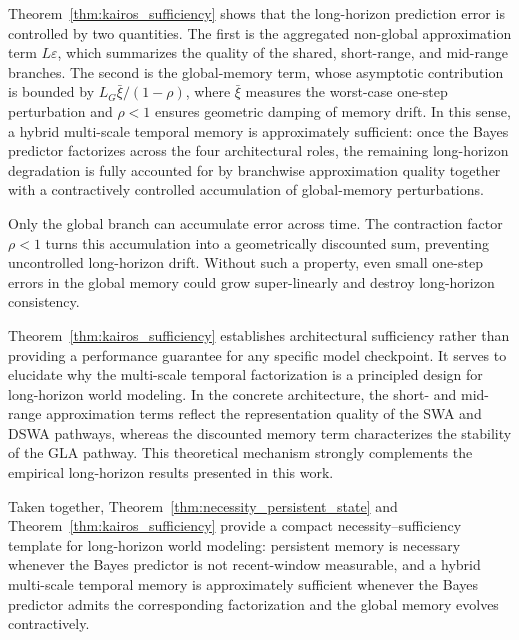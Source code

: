 \documentclass{llmxive}
\begin{document}
\begin{remark}
\label{rem:interpretation}
Theorem~\ref{thm:kairos_sufficiency} shows that the long-horizon prediction error is controlled by two quantities. The first is the aggregated non-global approximation term $L\varepsilon$, which summarizes the quality of the shared, short-range, and mid-range branches. The second is the global-memory term, whose asymptotic contribution is bounded by $L_G\bar\xi/(1-\rho)$, where $\bar\xi$ measures the worst-case one-step perturbation and $\rho<1$ ensures geometric damping of memory drift. In this sense, a hybrid multi-scale temporal memory is approximately sufficient: once the Bayes predictor factorizes across the four architectural roles, the remaining long-horizon degradation is fully accounted for by branchwise approximation quality together with a contractively controlled accumulation of global-memory perturbations.
\end{remark}




\begin{remark}
\label{rem:gla_nontrivial}
Only the global branch can accumulate error across time. The contraction factor $\rho<1$ turns this accumulation into a geometrically discounted sum, preventing uncontrolled long-horizon drift. Without such a property, even small one-step errors in the global memory could grow super-linearly and destroy long-horizon consistency.
\end{remark}

\begin{remark}
\label{rem:scope}
Theorem~\ref{thm:kairos_sufficiency} establishes architectural sufficiency rather than providing a performance guarantee for any specific model checkpoint. It serves to elucidate why the multi-scale temporal factorization is a principled design for long-horizon world modeling. In the concrete architecture, the short- and mid-range approximation terms reflect the representation quality of the SWA and DSWA pathways, whereas the discounted memory term characterizes the stability of the GLA pathway. This theoretical mechanism strongly complements the empirical long-horizon results presented in this work.
\end{remark}


\begin{remark}
\label{rem:necessity_sufficiency_pair}
Taken together, Theorem~\ref{thm:necessity_persistent_state} and Theorem~\ref{thm:kairos_sufficiency} provide a compact necessity--sufficiency template for long-horizon world modeling: persistent memory is necessary whenever the Bayes predictor is not recent-window measurable, and a hybrid multi-scale temporal memory is approximately sufficient whenever the Bayes predictor admits the corresponding factorization and the global memory evolves contractively.
\end{remark}
\end{document}
